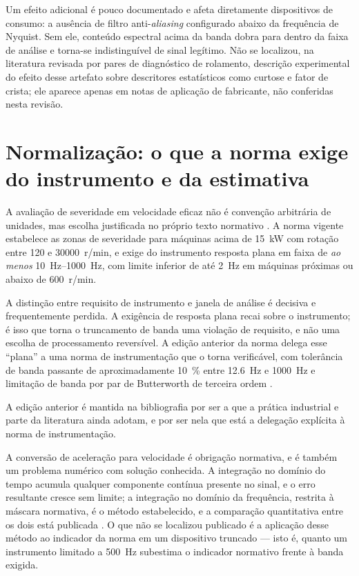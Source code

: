 Um efeito adicional é pouco documentado e afeta diretamente dispositivos de consumo: a
ausência de filtro anti-\emph{aliasing} configurado abaixo da frequência de Nyquist. Sem
ele, conteúdo espectral acima da banda dobra para dentro da faixa de análise e torna-se
indistinguível de sinal legítimo. Não se localizou, na literatura revisada por pares de
diagnóstico de rolamento, descrição experimental do efeito desse artefato sobre descritores
estatísticos como curtose e fator de crista; ele aparece apenas em notas de aplicação de
fabricante, não conferidas nesta revisão.

\section{Normalização: o que a norma exige do instrumento e da estimativa}
\label{sec:rev-norma}

A avaliação de severidade em velocidade eficaz não é convenção arbitrária de unidades, mas
escolha justificada no próprio texto normativo \cite{iso208163_2022}. A norma vigente
estabelece as zonas de severidade para máquinas acima de \SI{15}{\kilo\watt} com rotação
entre \num{120} e \num{30000}~r/min, e exige do instrumento resposta plana em faixa de
\emph{ao menos} \SIrange{10}{1000}{\hertz}, com limite inferior de até \SI{2}{\hertz} em
máquinas próximas ou abaixo de \num{600}~r/min.

A distinção entre requisito de instrumento e janela de análise é decisiva e frequentemente
perdida. A exigência de resposta plana recai sobre o instrumento; é isso que torna o
truncamento de banda uma violação de requisito, e não uma escolha de processamento
reversível. A edição anterior da norma delega esse ``plana'' a uma norma de instrumentação
que o torna verificável, com tolerância de banda passante de aproximadamente
\SI{10}{\percent} entre \SI{12,6}{\hertz} e \SI{1000}{\hertz} e limitação de banda por par
de Butterworth de terceira ordem \cite{iso2954_2012}.

 A edição anterior
é mantida na bibliografia por ser a que a prática industrial e parte da literatura ainda
adotam, e por ser nela que está a delegação explícita à norma de instrumentação.

A conversão de aceleração para velocidade é obrigação normativa, e é também um problema
numérico com solução conhecida. A integração no domínio do tempo acumula qualquer
componente contínua presente no sinal, e o erro resultante cresce sem limite; a integração
no domínio da frequência, restrita à máscara normativa, é o método estabelecido, e a
comparação quantitativa entre os dois está publicada \cite{brandt2014}. O que não se
localizou publicado é a aplicação desse método ao indicador da norma em um dispositivo
truncado --- isto é, quanto um instrumento limitado a \SI{500}{\hertz} subestima o
indicador normativo frente à banda exigida.


